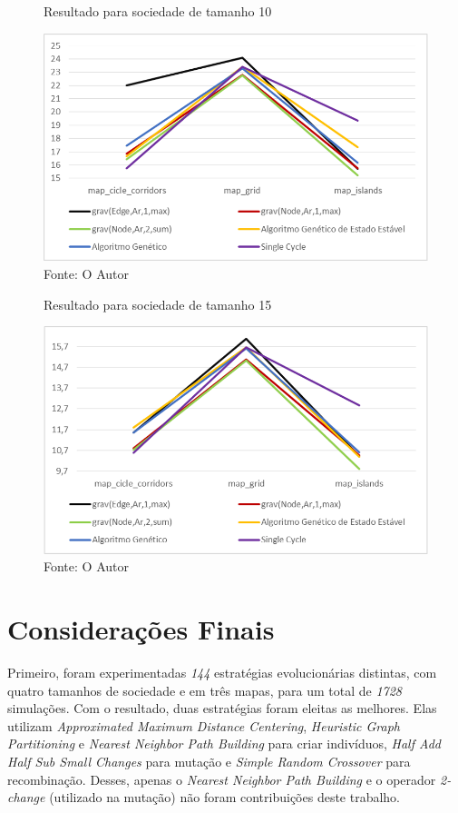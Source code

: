 \begin{figure}[H]
	\caption[Resultado para sociedade de tamanho 10]{Resultado para sociedade 
		de tamanho 10}
	\centering
	\includegraphics[width=\columnwidth]{images/graph_agent3.png}
	\caption*{Fonte: O Autor}
	\label{fig:graph_agentes3}
\end{figure}

\begin{figure}[H]
	\caption[Resultado para sociedade de tamanho 15]{Resultado para sociedade 
		de tamanho 15}
	\centering
	\includegraphics[width=\columnwidth]{images/graph_agent4.png}
	\caption*{Fonte: O Autor}
	\label{fig:graph_agentes4}
\end{figure}

\section{Considerações Finais}

Primeiro, foram experimentadas \textit{144} estratégias evolucionárias 
distintas, com quatro tamanhos de sociedade e em três mapas, para um total de 
\textit{1728} simulações. Com o resultado, duas estratégias foram eleitas as 
melhores. Elas utilizam \textit{Approximated Maximum Distance Centering}, 
\textit{Heuristic Graph Partitioning} e \textit{Nearest Neighbor Path Building} 
para criar indivíduos, \textit{Half Add Half Sub Small Changes} para mutação e 
\textit{Simple Random Crossover} para recombinação. Desses, apenas o 
\textit{Nearest Neighbor Path Building} e o operador \textit{2-change} 
(utilizado na mutação) não foram contribuições deste trabalho.

